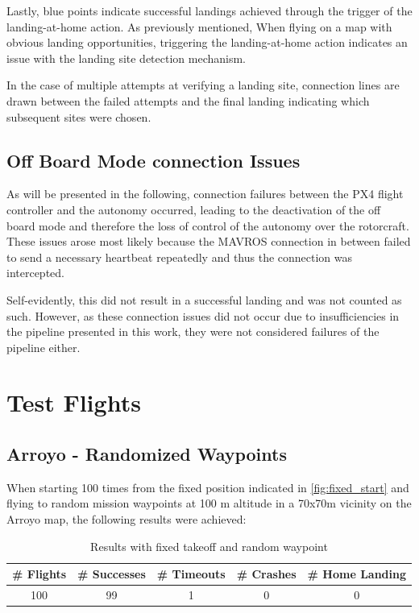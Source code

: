 Lastly, blue points indicate successful landings achieved through the trigger of the landing-at-home action. As previously mentioned, When flying on a map with obvious landing opportunities, triggering the landing-at-home action indicates an issue with the landing site detection mechanism.

In the case of multiple attempts at verifying a landing site, connection lines are drawn between the failed attempts and the final landing indicating which subsequent sites were chosen.


\subsection{Off Board Mode connection Issues}
As will be presented in the following, connection failures between the PX4 flight controller and the autonomy occurred, leading to the deactivation of the off board mode and therefore the loss of control of the autonomy over the rotorcraft. These issues arose most likely because the MAVROS connection in between failed to send a necessary heartbeat repeatedly and thus the connection was intercepted.

Self-evidently, this did not result in a successful landing and was not counted as such. However, as these connection issues did not occur due to insufficiencies in the pipeline presented in this work, they were not considered failures of the pipeline either.
\clearpage
\section{Test Flights}
\subsection{Arroyo - Randomized Waypoints}\label{subsec:eval_rand_wp}

When starting 100 times from the fixed position indicated in \cref{fig:fixed_start} and flying to random mission waypoints at 100 m altitude in a 70x70m vicinity on the Arroyo map, the following results were achieved:

\begin{table}[h]
    \begin{center}
     \caption{Results with fixed takeoff and random waypoint}\vspace{1ex}
     \label{tab:result_random_waypoint}
     \begin{tabular}{|c|c|c|c|c|}
     \hline
     \# Flights & \# Successes & \# Timeouts & \# Crashes & \# Home Landing\\ \hline \hline
     100 & 99 & 1 & 0 & 0 \\
     \hline
     \end{tabular}
    \end{center}
    \end{table}

